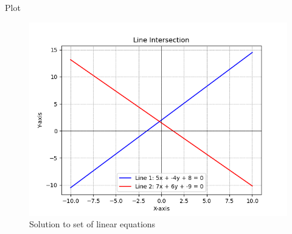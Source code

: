 \documentclass{beamer}
\theoremstyle{remark}
\numberwithin{equation}{section}
\begin{document}
\begin{frame}{Plot}
\begin{figure}[h!]
   \centering
   \includegraphics[width=0.7\columnwidth]{../../assignments/Problem 6/figs/fig.png}
    \caption{Solution to set of linear equations}
\end{figure}
\end{frame}
\end{document}
